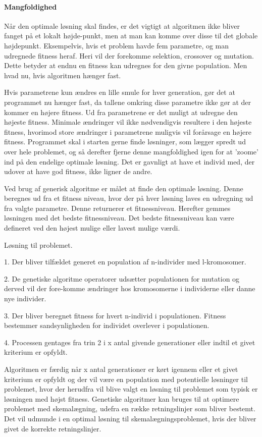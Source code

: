 \paragraph{Mangfoldighed}
Når den optimale løsning skal findes, er det vigtigt at algoritmen ikke bliver fanget på et lokalt højde-punkt, men at man kan komme over disse til det globale højdepunkt. Eksempelvis, hvis et problem havde fem parametre, og man udregnede fitness heraf. Heri vil der forekomme selektion, crossover og mutation. Dette betyder at endnu en fitness kan udregnes for den givne population. Men hvad nu, hvis algoritmen hænger fast. 

Hvis parametrene kun ændres en lille smule for hver generation, gør det at programmet nu hænger fast, da tallene omkring disse parametre ikke gør at der kommer en højere fitness. Ud fra parametrene er det muligt at udregne den højeste fitness. Minimale ændringer vil ikke nødvendigvis resultere i den højeste fitness, hvorimod store ændringer i parametrene muligvis vil forårsage en højere fitness. Programmet skal i starten gerne finde løsninger, som lægger spredt ud over hele problemet, og så derefter fjerne denne mangfoldighed igen for at ’zoome’ ind på den endelige optimale løsning. 
Det er gavnligt at have et individ med, der udover at have god fitness, ikke ligner de andre. 

Ved brug af generisk algoritme er målet at finde den optimale løsning. Denne beregnes ud fra et fitness niveau, hvor der på hver løsning laves en udregning ud fra valgte parametre. Denne returnerer et fitnessniveau. Herefter gemmes løsningen med det bedste fitnessniveau. Det bedste fitnessniveau kan være defineret ved den højest mulige eller lavest mulige værdi.

Løsning til problemet.

1.	Der bliver tilfældet generet en population af n-individer med l-kromosomer.


2.	De genetiske algoritme operatorer udsætter populationen for mutation og derved vil der fore-komme ændringer hos kromosomerne i individerne eller danne 	nye individer.


3.	Der bliver beregnet fitness for hvert n-individ i populationen. Fitness bestemmer sandsynligheden for individet overlever i populationen.


4.	Processen gentages fra trin 2 i x antal givende generationer eller indtil et givet kriterium er opfyldt.


Algoritmen er færdig når x antal generationer er kørt igennem eller et givet kriterium er opfyldt og der vil være en population med potentielle løsninger til problemet, hvor der herudfra vil blive valgt en løsning til problemet som typisk er løsningen med højst fitness. Genetiske algoritmer kan bruges til at optimere problemet med skemalægning, udefra en række retningslinjer som bliver bestemt. Det vil udmunde i en optimal løsning til skemalægningsproblemet, hvis der bliver givet de korrekte retningslinjer.

